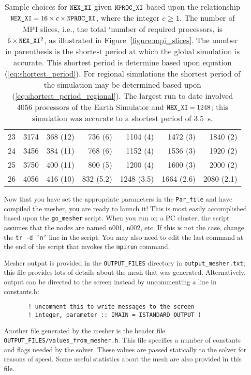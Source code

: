 \documentclass[onecolumn]{article}
\newcommand{\nexxi}{\mbox{\texttt{NEX\_XI}}}
\newcommand{\nprocxi}{\mbox{\texttt{NPROC\_XI}}}
\begin{document}
\begin{table}[t]
\begin{tabular}{|c|c|rrrrr|}
23 & 3174 & 368 (12) & 736 (6) & 1104 (4) & 1472 (3) & 1840 (2) \\
24 & 3456 & 384 (11) & 768 (6) & 1152 (4) & 1536 (3) & 1920 (2) \\
25 & 3750 & 400 (11) & 800 (5) & 1200 (4) & 1600 (3) & 2000 (2) \\
26 & 4056 & 416 (10) & 832 (5.2) & 1248 (3.5) & 1664 (2.6) & 2080 (2.1) \\
\hline
\end{tabular}
\caption{
Sample choices for $\nexxi$ given $\nprocxi$ based upon the
relationship $\nexxi=16\times c\times \nprocxi$, where the integer $c\ge1$.
The number of MPI slices, i.e., the total `number of required processors,
is $6\times \nexxi^2$, as illustrated in Figure~\ref{figure:mpi_slices}.
The number in parenthesis is the shortest period at which the
global simulation is accurate.
This shortest period is determine based upon
equation (\ref{eq:shortest_period}).
For regional simulations the shortest period of the
simulation may be determined based upon
(\ref{eq:shortest_period_regional}).
The largest run to date involved 4056 processors of the Earth Simulator
and $\nexxi=1248$; this simulation was accurate to a shortest period of 3.5~s.
}
\label{table:nex}
\end{table}
Now that you have set the appropriate parameters in the \texttt{Par\_file}
and have compiled the mesher, you are ready to launch it! This is most
easily accomplished based upon the \texttt{go\_mesher} script.
When you run on a PC cluster,
the script assumes that the nodes are named n001, n002, etc.
If this is not the case, change the \texttt{tr -d 'n'} line in the script.
You may also need to edit the last command at the end of the script that invokes the
\texttt{mpirun} command.

Mesher output is provided in the \texttt{OUTPUT\_FILES} directory in
\texttt{output\_mesher.txt};
this file provides lots of details about the mesh that was generated.
Alternatively, output can be directed to the screen instead
by uncommenting a line in constants.h:
\begin{verbatim}
       ! uncomment this to write messages to the screen
       ! integer, parameter :: IMAIN = ISTANDARD_OUTPUT )
\end{verbatim}

Another file generated by the mesher is
the header file \texttt{OUTPUT\_FILES/values\_from\_mesher.h}.
This file specifies a number of constants and flags needed by the solver.
These values are passed statically to the solver for reasons of speed.
Some useful statistics about the mesh are also
provided in this file.
\end{document}
